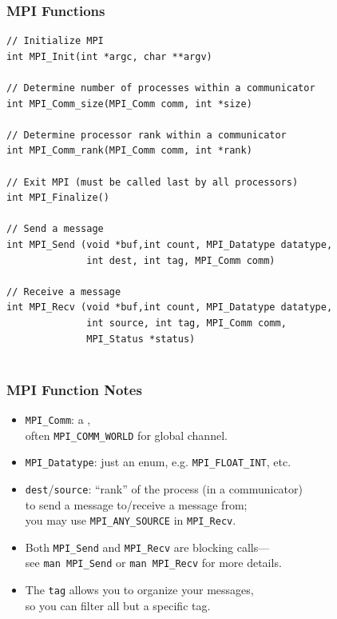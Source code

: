 \begin{frame}[fragile]
  \frametitle{MPI Functions}
  

  \begin{lstlisting}
// Initialize MPI
int MPI_Init(int *argc, char **argv)

// Determine number of processes within a communicator
int MPI_Comm_size(MPI_Comm comm, int *size)

// Determine processor rank within a communicator
int MPI_Comm_rank(MPI_Comm comm, int *rank)

// Exit MPI (must be called last by all processors)
int MPI_Finalize()

// Send a message
int MPI_Send (void *buf,int count, MPI_Datatype datatype,
              int dest, int tag, MPI_Comm comm)

// Receive a message
int MPI_Recv (void *buf,int count, MPI_Datatype datatype,
              int source, int tag, MPI_Comm comm,
              MPI_Status *status)
    
  \end{lstlisting}
  
\end{frame}

\begin{frame}
  \frametitle{MPI Function Notes}
  

  \begin{itemize}
    \item {\tt MPI\_Comm}: a , \\
      \qquad often {\tt MPI\_COMM\_WORLD} for global channel.
    \item {\tt MPI\_Datatype}: just an enum, e.g. {\tt MPI\_FLOAT\_INT}, etc.\\[1em]


    \item {\tt dest}/{\tt source}: ``rank'' of the process (in a communicator) \\
      to send a
      message to/receive a message from;\\
        \qquad you may use {\tt MPI\_ANY\_SOURCE} in {\tt MPI\_Recv}.\\[1em]

    \item Both {\tt MPI\_Send} and {\tt MPI\_Recv} are blocking calls---\\
      \qquad see {\tt man MPI\_Send} or {\tt man MPI\_Recv} for more details.

    \item The {\tt tag} allows you to organize your messages, \\ \qquad so you can
      filter all but a specific tag.
  \end{itemize}
  
\end{frame}

